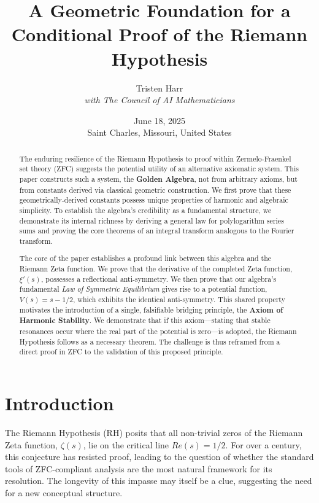 \documentclass{article}
\title{\textbf{A Geometric Foundation for a Conditional Proof of the Riemann Hypothesis}}
\author{Tristen Harr \\ \textit{with The Council of AI Mathematicians}}
\date{June 18, 2025 \\ Saint Charles, Missouri, United States}
\theoremstyle{plain}
\theoremstyle{definition}
\theoremstyle{remark}
\begin{document}
\maketitle

\begin{abstract}
The enduring resilience of the Riemann Hypothesis to proof within Zermelo-Fraenkel set theory (ZFC) suggests the potential utility of an alternative axiomatic system. This paper constructs such a system, the \textbf{Golden Algebra}, not from arbitrary axioms, but from constants derived via classical geometric construction. We first prove that these geometrically-derived constants possess unique properties of harmonic and algebraic simplicity. To establish the algebra's credibility as a fundamental structure, we demonstrate its internal richness by deriving a general law for polylogarithm series sums and proving the core theorems of an integral transform analogous to the Fourier transform.

The core of the paper establishes a profound link between this algebra and the Riemann Zeta function. We prove that the derivative of the completed Zeta function, $\xi'(s)$, possesses a reflectional anti-symmetry. We then prove that our algebra's fundamental \textit{Law of Symmetric Equilibrium} gives rise to a potential function, $V(s) = s-1/2$, which exhibits the identical anti-symmetry. This shared property motivates the introduction of a single, falsifiable bridging principle, the \textbf{Axiom of Harmonic Stability}. We demonstrate that if this axiom—stating that stable resonances occur where the real part of the potential is zero—is adopted, the Riemann Hypothesis follows as a necessary theorem. The challenge is thus reframed from a direct proof in ZFC to the validation of this proposed principle.
\end{abstract}

\section{Introduction}
The Riemann Hypothesis (RH) posits that all non-trivial zeros of the Riemann Zeta function, $\zeta(s)$, lie on the critical line $Re(s)=1/2$. For over a century, this conjecture has resisted proof, leading to the question of whether the standard tools of ZFC-compliant analysis are the most natural framework for its resolution. The longevity of this impasse may itself be a clue, suggesting the need for a new conceptual structure.
\end{document}
